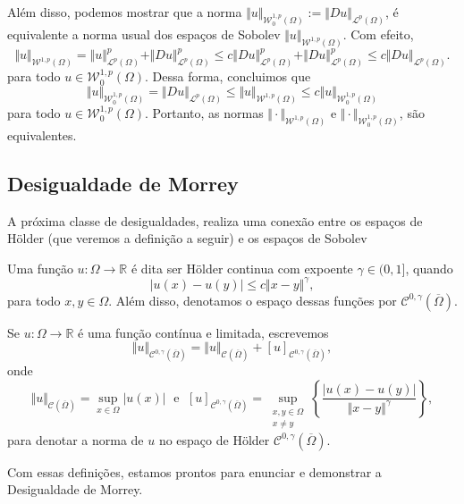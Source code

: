 \documentclass[a4paper, 11pt]{book}
\theoremstyle{definition}
\newcommand{\bR}{\mathbb{R}}
\newcommand{\cC}{\mathcal{C}}
\newcommand{\cL}{\mathcal{L}}
\newcommand{\cW}{\mathcal{W}}
\begin{document}
Além disso, podemos mostrar que a norma $\Vert u \Vert_{\cW_0^{1,p}(\Omega)} := \Vert Du \Vert_{\cL^p(\Omega)}$, é equivalente a norma usual dos espaços de Sobolev $\Vert u \Vert_{\cW^{1,p}(\Omega)}$. Com efeito,
\[
    \Vert u \Vert_{\cW^{1,p}(\Omega)} = \Vert u \Vert_{\cL^p(\Omega)}^p + \Vert Du \Vert_{\cL^p(\Omega)}^p \leqslant c \Vert Du \Vert_{\cL^p(\Omega)}^p + \Vert Du \Vert_{\cL^p(\Omega)}^p \leqslant c \Vert Du \Vert_{\cL^p(\Omega)}.
\]
para todo $u \in \cW^{1,p}_0(\Omega)$.
Dessa forma, concluimos que
\[
    \Vert u \Vert_{\cW^{1,p}_0(\Omega)} = \Vert Du \Vert_{\cL^p(\Omega)} \leqslant \Vert u \Vert_{\cW^{1,p}(\Omega)} \leqslant c \Vert u \Vert_{\cW^{1,p}_0(\Omega)}
\]
para todo $u \in \cW^{1,p}_0(\Omega)$.
Portanto, as normas $\Vert \cdot \Vert_{\cW^{1,p}(\Omega)}$ e $\Vert \cdot \Vert_{\cW^{1,p}_0(\Omega)}$, são equivalentes.

\subsection{Desigualdade de Morrey}

A próxima classe de desigualdades, realiza uma conexão entre os espaços de Hölder (que veremos a definição a seguir) e os espaços de Sobolev

\begin{dbox}
    Uma função $u : \Omega \to \bR$ é dita ser Hölder continua com expoente $\gamma \in (0,1]$, quando
    \[
        |u(x) - u(y)| \leqslant c \Vert x - y \Vert^\gamma,
    \]
    para todo $x,y \in \Omega$. Além disso, denotamos o espaço dessas funções por $\cC^{0,\gamma}(\overline\Omega)$.
\end{dbox}

\begin{dbox}
    Se $u : \Omega \to \bR$ é uma função contínua e limitada, escrevemos
    \[
        \Vert u \Vert_{\cC^{0,\gamma}(\overline\Omega)} = \Vert u \Vert_{\cC(\overline\Omega)} + [u]_{\cC^{0,\gamma}(\overline\Omega)},
    \]
    onde
    \[
        \Vert u \Vert_{\cC(\overline\Omega)} = \sup_{x \in \Omega} |u(x)| \;\text{ e }\; [u]_{\cC^{0,\gamma}(\overline\Omega)} = \sup_{\substack{x,y \in \Omega\\x \neq y}} \left\{ \frac{|u(x) - u(y)|}{\Vert x - y \Vert^\gamma} \right\},
    \]
    para denotar a norma de $u$ no espaço de Hölder $\cC^{0,\gamma}(\overline\Omega)$.
\end{dbox}

Com essas definições, estamos prontos para enunciar e demonstrar a Desigualdade de Morrey.
\end{document}
